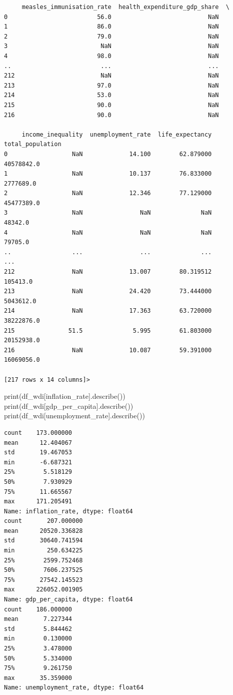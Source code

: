 \documentclass[
  letterpaper,
  DIV=11,
  numbers=noendperiod]{scrartcl}
\newenvironment{Shaded}{\begin{snugshade}}{\end{snugshade}}
\newcommand{\BuiltInTok}[1]{\textcolor[rgb]{0.00,0.23,0.31}{#1}}
\newcommand{\NormalTok}[1]{\textcolor[rgb]{0.00,0.23,0.31}{#1}}
\newcommand{\StringTok}[1]{\textcolor[rgb]{0.13,0.47,0.30}{#1}}
\begin{document}
\begin{verbatim}
     measles_immunisation_rate  health_expenditure_gdp_share  \
0                         56.0                           NaN   
1                         86.0                           NaN   
2                         79.0                           NaN   
3                          NaN                           NaN   
4                         98.0                           NaN   
..                         ...                           ...   
212                        NaN                           NaN   
213                       97.0                           NaN   
214                       53.0                           NaN   
215                       90.0                           NaN   
216                       90.0                           NaN   

     income_inequality  unemployment_rate  life_expectancy  total_population  
0                  NaN             14.100        62.879000        40578842.0  
1                  NaN             10.137        76.833000         2777689.0  
2                  NaN             12.346        77.129000        45477389.0  
3                  NaN                NaN              NaN           48342.0  
4                  NaN                NaN              NaN           79705.0  
..                 ...                ...              ...               ...  
212                NaN             13.007        80.319512          105413.0  
213                NaN             24.420        73.444000         5043612.0  
214                NaN             17.363        63.720000        38222876.0  
215               51.5              5.995        61.803000        20152938.0  
216                NaN             10.087        59.391000        16069056.0  

[217 rows x 14 columns]>
\end{verbatim}

\begin{Shaded}
\begin{Highlighting}[]
\BuiltInTok{print}\NormalTok{(df\_wdi[}\StringTok{\textquotesingle{}inflation\_rate\textquotesingle{}}\NormalTok{].describe())}
\BuiltInTok{print}\NormalTok{(df\_wdi[}\StringTok{\textquotesingle{}gdp\_per\_capita\textquotesingle{}}\NormalTok{].describe())}
\BuiltInTok{print}\NormalTok{(df\_wdi[}\StringTok{\textquotesingle{}unemployment\_rate\textquotesingle{}}\NormalTok{].describe())}
\end{Highlighting}
\end{Shaded}

\begin{verbatim}
count    173.000000
mean      12.404067
std       19.467053
min       -6.687321
25%        5.518129
50%        7.930929
75%       11.665567
max      171.205491
Name: inflation_rate, dtype: float64
count       207.000000
mean      20520.336828
std       30640.741594
min         250.634225
25%        2599.752468
50%        7606.237525
75%       27542.145523
max      226052.001905
Name: gdp_per_capita, dtype: float64
count    186.000000
mean       7.227344
std        5.844462
min        0.130000
25%        3.478000
50%        5.334000
75%        9.261750
max       35.359000
Name: unemployment_rate, dtype: float64
\end{verbatim}
\end{document}
